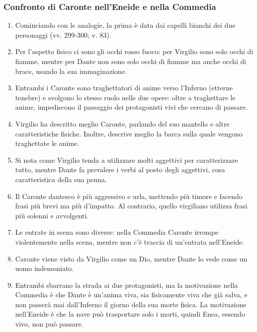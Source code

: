 \documentclass{article}
\begin{document}
\subsubsection{Confronto di Caronte nell'Eneide e nella Commedia}
\begin{enumerate}
    \item Cominciando con le analogie, la prima è data dai capelli bianchi dei due personaggi (vv. 299-300; v. 83).
    \item Per l'aspetto fisico ci sono gli occhi rosso fuoco: per Virgilio sono solo occhi di fiamme, mentre per Dante non sono solo occhi di fiamme ma anche occhi di brace, usando la sua immaginazione.
    \item Entrambi i Caronte sono traghettatori di anime verso l'Inferno (etterne tenebre) e svolgono lo stesso ruolo nelle due opere: oltre a traghettare le anime, impediscono il passaggio dei protagonisti vivi che cercano di passare.
    \item Virgilio ha descritto meglio Caronte, parlando del suo mantello e altre caratteristiche fisiche. Inoltre, descrive meglio la barca sulla quale vengono traghettate le anime.
    \item Si nota come Virgilio tenda a utilizzare molti aggettivi per caratterizzare tutto, mentre Dante fa prevalere i verbi al posto degli aggettivi, cosa caratteristica della sua penna.
    \item Il Caronte dantesco è più aggressivo e urla, mettendo più timore e facendo frasi più brevi ma più d'impatto. Al contrario, quello virgiliano utilizza frasi più solenni e avvolgenti.
    \item Le entrate in scena sono diverse: nella Commedia Caronte irrompe violentemente nella scena, mentre non c'è traccia di un'entrata nell'Eneide.
    \item Caronte viene visto da Virgilio come un Dio, mentre Dante lo vede come un uomo indemoniato.
    \item Entrambi sbarrano la strada ai due protagonisti, ma la motivazione nella Commedia è che Dante è un'anima viva, sia fisicamente viva che già salva, e non passerà mai dall'Inferno il giorno della sua morte fisica. La motivazione nell'Eneide è che la nave può trasportare solo i morti, quindi Enea, essendo vivo, non può passare.
\end{enumerate}
\end{document}
